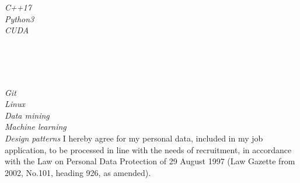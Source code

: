 \documentclass[10pt]{article} %
\begin{document}
{
\begin{minipage}{0.1\textwidth}
\textit{C++17} \\
\textit{Python3} \\
\textit{CUDA} \\
\end{minipage}
\begin{minipage}{0.1\textwidth}
\FiveStar \FiveStar \FiveStar \\
\FiveStar \FiveStar \FiveStarOpen \\
\FiveStar \FiveStar \FiveStarOpen \\
\end{minipage}
}


{
\textit{Git}\\
\textit{Linux}\\
\textit{Data mining}\\
\textit{Machine learning}\\
\textit{Design patterns}
}
\tiny{
I hereby agree for my personal data, included in my job application, to be processed in line with the needs of recruitment, in accordance with the Law on Personal Data Protection of 29 August 1997 (Law Gazette from 2002, No.101, heading 926, as amended).
}
\end{document}
